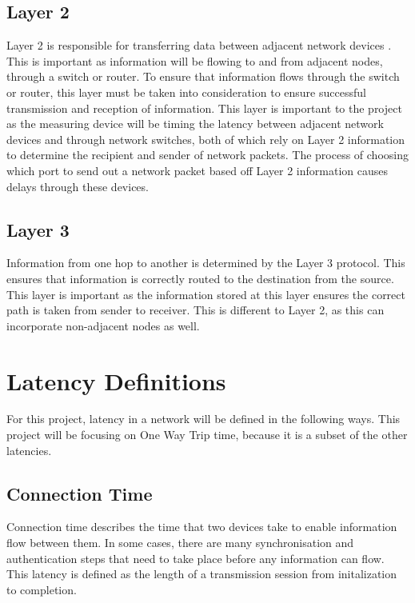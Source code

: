 \subsection{Layer 2}

Layer 2 is responsible for transferring data between adjacent network devices \cite{IEEE802}. This is important as 
information will be flowing to and from adjacent nodes, through a switch or router. To ensure that information flows 
through the switch or router, this layer must be taken into consideration to ensure successful transmission and 
reception of information. This layer is important to the project as the measuring device will be timing the latency 
between adjacent network devices and through network switches, both of which rely on Layer 2 information to determine 
the recipient and sender of network packets. The process of choosing which port to send out a network packet based off
Layer 2 information causes delays through these devices.

\subsection{Layer 3}

Information from one hop to another is determined by the Layer 3 protocol. This ensures that
information is correctly routed to the destination from the source. This layer is important as the
information stored at this layer ensures the correct path is taken from sender to receiver. This is
different to Layer 2, as this can incorporate non-adjacent nodes as well.

\section{Latency Definitions}

For this project, latency in a network will be defined in the following ways. 
This project will be focusing on One Way Trip time, because it is a subset of the other latencies.

\subsection{Connection Time}

Connection time describes the time that two devices take to enable information flow between them. In
some cases, there are many synchronisation and authentication steps that need to take place before
any information can flow. This latency is defined as the length of a transmission session from initalization to 
completion.


